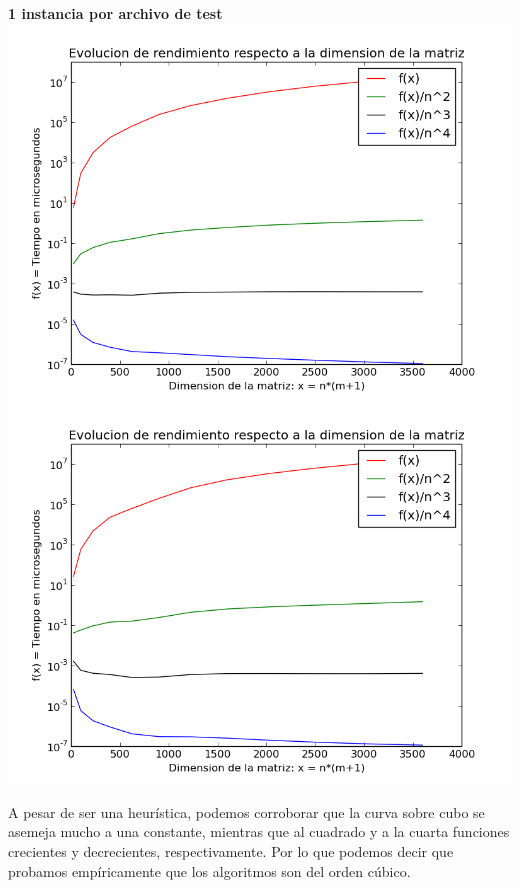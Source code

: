 \begin{center}
\textbf{1 instancia por archivo de test}\\
\includegraphics[scale=0.35]{experimentos2a_2b/tiempos_nm_fitteo_1_inst/eliminacion_gaussiana_time_consumed.png}
\includegraphics[scale=0.35]{experimentos2a_2b/tiempos_nm_fitteo_1_inst/factorizacion_lu_time_consumed.png}
\end{center}

A pesar de ser una heur\'istica, podemos corroborar que la curva sobre cubo se asemeja mucho a una constante, mientras que al cuadrado y a la cuarta funciones crecientes y decrecientes, respectivamente. Por lo que podemos decir que probamos emp\'iricamente que los algoritmos son del orden c\'ubico.

